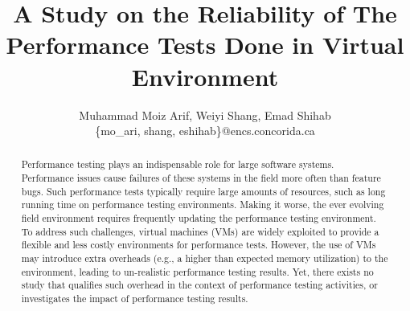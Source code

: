 \documentclass[review]{elsarticle}
\begin{document}
	
	\begin{frontmatter}
		
		\title{A Study on the Reliability of The Performance Tests Done in Virtual Environment}
		
		\author{Muhammad Moiz Arif, Weiyi Shang, Emad Shihab \\ \{mo\_ari, shang, eshihab\}@encs.concorida.ca}%
		\address{Department of Computer Science and Software Engineering \\ Concordia University \\ Montreal, Quebec}
		
		
		
		
		\begin{abstract}
			Performance testing plays an indispensable role for large software systems. Performance issues cause failures of these systems in the field more often than feature bugs. Such performance tests typically require large amounts of resources, such as long running time on performance testing environments. Making it worse, the ever evolving field environment requires frequently updating the performance testing environment. To address such challenges, virtual machines (VMs) are widely exploited to provide a flexible and less costly environments for performance tests. However, the use of VMs may introduce extra overheads (e.g., a higher than expected memory utilization) to the environment, leading to un-realistic performance testing results. Yet, there exists no study that qualifies such overhead in the context of performance testing activities, or investigates the impact of performance testing results. 
			

\end{abstract}
\end{frontmatter}
\end{document}
